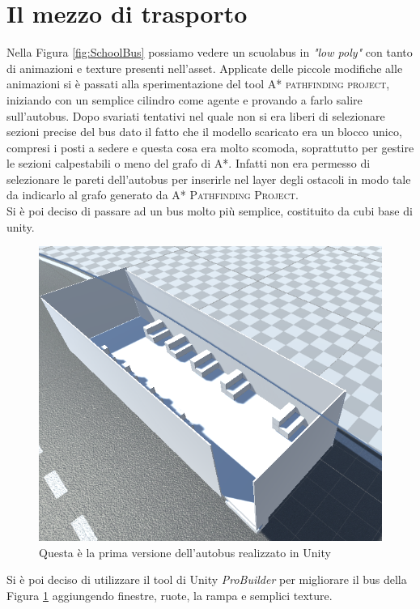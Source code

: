 \documentclass[12pt, openany]{book}
\begin{document}
	\section{Il mezzo di trasporto}
	Nella Figura \ref{fig:SchoolBus} possiamo vedere un scuolabus in \emph{"low poly"} con tanto di animazioni e texture presenti nell'asset. Applicate delle piccole modifiche alle animazioni si è passati alla sperimentazione del tool \textsc{A* pathfinding project}, iniziando con un semplice cilindro come agente e provando a farlo salire sull'autobus. Dopo svariati tentativi nel quale non si era liberi di selezionare sezioni precise del bus dato il fatto che il modello scaricato era un blocco unico, compresi i posti a sedere e questa cosa era molto scomoda, soprattutto per gestire le sezioni calpestabili o meno del grafo di A*. Infatti non era permesso di selezionare le pareti dell'autobus per inserirle nel layer degli ostacoli in modo tale da indicarlo al grafo generato da \textsc{A* Pathfinding Project}.\\
	Si è poi deciso di passare ad un bus molto più semplice, costituito da cubi base di unity.
	\begin{figure}[H]
		\centering
		\includegraphics[width=0.8\linewidth]{"Immagini/AutobusBase.png"}
		\caption{Questa è la prima versione dell'autobus realizzato in Unity}
		\label{fig:AutobusBase}
	\end{figure}
	Si è poi deciso di utilizzare il tool di Unity \emph{ProBuilder} per migliorare il bus della Figura \ref{fig:AutobusBase} aggiungendo finestre, ruote, la rampa e semplici texture.
\end{document}
